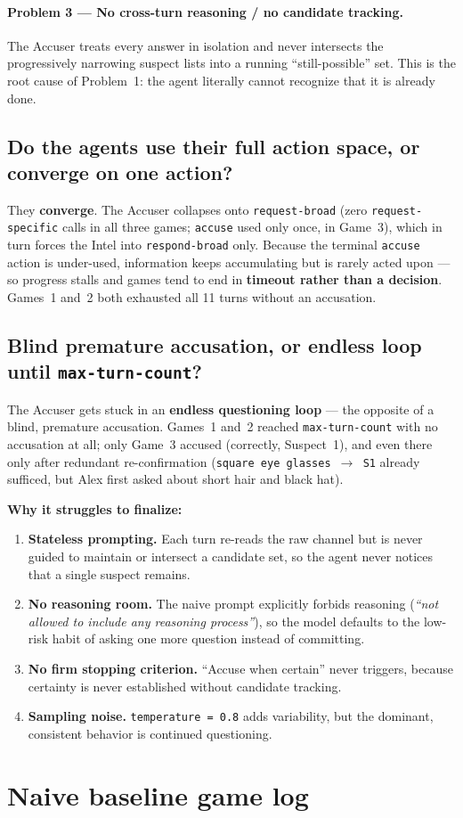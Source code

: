 \documentclass{article}
\begin{document}
\paragraph{Problem 3 --- No cross-turn reasoning / no candidate tracking.} The Accuser
treats every answer in isolation and never intersects the progressively narrowing suspect
lists into a running ``still-possible'' set. This is the root cause of Problem~1: the agent
literally cannot recognize that it is already done.

\subsection*{Do the agents use their full action space, or converge on one action?}
They \textbf{converge}. The Accuser collapses onto \texttt{request-broad}
(zero \texttt{request-specific} calls in all three games; \texttt{accuse} used only once,
in Game~3), which in turn forces the Intel into \texttt{respond-broad} only. Because the
terminal \texttt{accuse} action is under-used, information keeps accumulating but is rarely
acted upon --- so progress stalls and games tend to end in \textbf{timeout rather than a
decision}. Games~1 and~2 both exhausted all 11 turns without an accusation.

\subsection*{Blind premature accusation, or endless loop until \texttt{max-turn-count}?}
The Accuser gets stuck in an \textbf{endless questioning loop} --- the opposite of a blind,
premature accusation. Games~1 and~2 reached \texttt{max-turn-count} with no accusation at
all; only Game~3 accused (correctly, Suspect~1), and even there only after redundant
re-confirmation (\texttt{square eye glasses $\rightarrow$ S1} already sufficed, but Alex
first asked about short hair and black hat).

\medskip
\noindent\textbf{Why it struggles to finalize:}
\begin{enumerate}[leftmargin=1.6em]
  \item \textbf{Stateless prompting.} Each turn re-reads the raw channel but is never
  guided to maintain or intersect a candidate set, so the agent never notices that a single
  suspect remains.
  \item \textbf{No reasoning room.} The naive prompt explicitly forbids reasoning
  (\emph{``not allowed to include any reasoning process''}), so the model defaults to the
  low-risk habit of asking one more question instead of committing.
  \item \textbf{No firm stopping criterion.} ``Accuse when certain'' never triggers,
  because certainty is never established without candidate tracking.
  \item \textbf{Sampling noise.} \texttt{temperature = 0.8} adds variability, but the
  dominant, consistent behavior is continued questioning.
\end{enumerate}

\appendix
\section{Naive baseline game log}
\label{app:naive}

\end{document}

